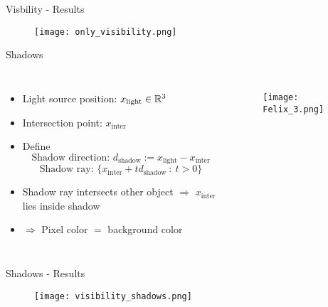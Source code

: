 \begin{frame}{Visbility - Results}
    \begin{figure}
                \centering
                \texttt{[image: only\_visibility.png]}
            \end{figure}
\end{frame}

\begin{frame}{Shadows}
    \begin{columns}
        \begin{itemize}
        \item Light source position: $x_{\text{light}}\in\mathbb{R}^3$
        \item Intersection point: $x_{\text{inter}}$
        \item Define
        $$
        \text{Shadow direction: }d_{\text{shadow}} := x_{\text{light}} - x_{\text{inter}}
        $$
        $$
        \text{Shadow ray: }\{x_{\text{inter}} + t d_{\text{shadow}} \ : \ t > 0\}
        $$
        \item Shadow ray intersects other object $\Rightarrow$ $x_{\text{inter}}$ lies inside shadow
        \item $\Rightarrow$ Pixel color $=$ background color
        \end{itemize}
        \begin{figure}
                \centering
                \texttt{[image: Felix\_3.png]}
            \end{figure}
    \end{columns}
\end{frame}

\begin{frame}{Shadows - Results}
    \begin{figure}
                \centering
                \texttt{[image: visibility\_shadows.png]}
            \end{figure}
\end{frame}

